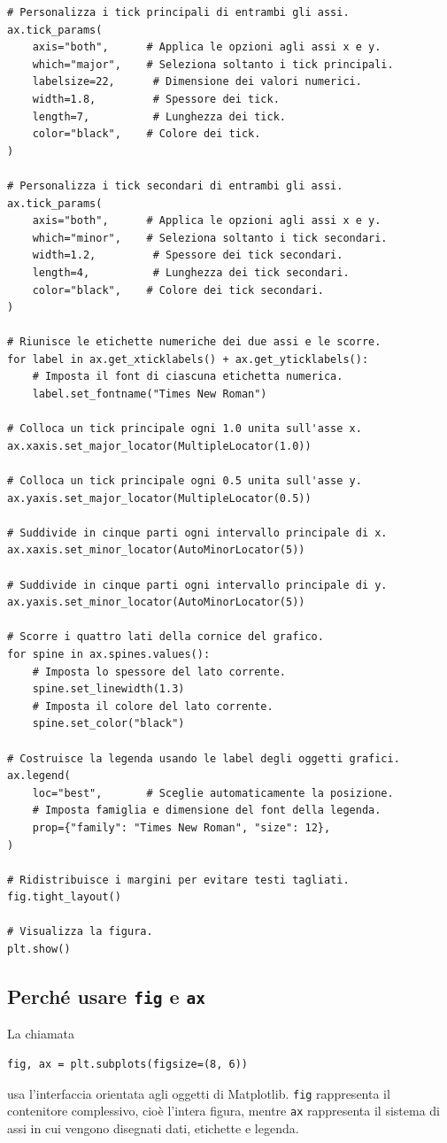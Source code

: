 \documentclass[11pt,a4paper]{book}
\begin{document}
\begin{lstlisting}
# Personalizza i tick principali di entrambi gli assi.
ax.tick_params(
    axis="both",      # Applica le opzioni agli assi x e y.
    which="major",    # Seleziona soltanto i tick principali.
    labelsize=22,      # Dimensione dei valori numerici.
    width=1.8,         # Spessore dei tick.
    length=7,          # Lunghezza dei tick.
    color="black",    # Colore dei tick.
)

# Personalizza i tick secondari di entrambi gli assi.
ax.tick_params(
    axis="both",      # Applica le opzioni agli assi x e y.
    which="minor",    # Seleziona soltanto i tick secondari.
    width=1.2,         # Spessore dei tick secondari.
    length=4,          # Lunghezza dei tick secondari.
    color="black",    # Colore dei tick secondari.
)

# Riunisce le etichette numeriche dei due assi e le scorre.
for label in ax.get_xticklabels() + ax.get_yticklabels():
    # Imposta il font di ciascuna etichetta numerica.
    label.set_fontname("Times New Roman")

# Colloca un tick principale ogni 1.0 unita sull'asse x.
ax.xaxis.set_major_locator(MultipleLocator(1.0))

# Colloca un tick principale ogni 0.5 unita sull'asse y.
ax.yaxis.set_major_locator(MultipleLocator(0.5))

# Suddivide in cinque parti ogni intervallo principale di x.
ax.xaxis.set_minor_locator(AutoMinorLocator(5))

# Suddivide in cinque parti ogni intervallo principale di y.
ax.yaxis.set_minor_locator(AutoMinorLocator(5))

# Scorre i quattro lati della cornice del grafico.
for spine in ax.spines.values():
    # Imposta lo spessore del lato corrente.
    spine.set_linewidth(1.3)
    # Imposta il colore del lato corrente.
    spine.set_color("black")

# Costruisce la legenda usando le label degli oggetti grafici.
ax.legend(
    loc="best",       # Sceglie automaticamente la posizione.
    # Imposta famiglia e dimensione del font della legenda.
    prop={"family": "Times New Roman", "size": 12},
)

# Ridistribuisce i margini per evitare testi tagliati.
fig.tight_layout()

# Visualizza la figura.
plt.show()
\end{lstlisting}

\subsection{Perché usare \texttt{fig} e \texttt{ax}}
La chiamata
\begin{lstlisting}
fig, ax = plt.subplots(figsize=(8, 6))
\end{lstlisting}
usa l'interfaccia orientata agli oggetti di Matplotlib. \texttt{fig} rappresenta il contenitore complessivo, cioè l'intera figura, mentre \texttt{ax} rappresenta il sistema di assi in cui vengono disegnati dati, etichette e legenda.
\end{document}
